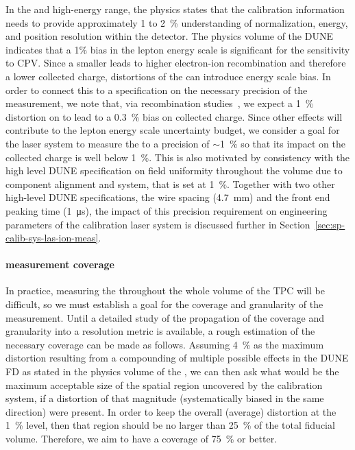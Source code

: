 In the  and high-energy range, the  physics  states that the calibration information needs to provide approximately \num{1} to \SI{2}{\%} understanding of normalization, energy, and position resolution within the detector.
The physics volume of the DUNE ~\cite{Acciarri:2015uup} indicates that a \num{1}\% bias in the lepton energy scale is significant for the  sensitivity to CPV. 
Since a smaller \efield leads to higher electron-ion recombination and therefore a lower collected charge, distortions of the \efield can introduce
energy scale bias. In order to connect this
to a specification on the necessary precision of the \efield measurement, we note that, via recombination studies~\cite{bib:mooney2018}, we expect a \SI{1}{\%} distortion on \efield to lead to a \SI{0.3}{\%} bias on collected charge.
Since other effects will contribute to the lepton energy scale uncertainty budget, we consider a goal for the 
laser system to measure the \efield to a precision of $\sim$\SI{1}{\%} so that its impact on the collected charge is well below \SI{1}{\%}.
This is also motivated by consistency with the high level DUNE specification on field uniformity throughout the volume due to component alignment and  system, that 
is set at \SI{1}{\%}.
Together with two other high-level DUNE specifications, the  wire spacing (\SI{4.7}{\mm}) and the front end peaking time (\SI{1}{\micro\s}), the impact of this \efield precision requirement on engineering parameters of the calibration laser system is discussed further %
in Section~\ref{sec:sp-calib-sys-las-ion-meas}.

\paragraph{\efield measurement coverage}

In practice, measuring the \efield  throughout the whole volume
of the TPC will be difficult, 
so we must establish a goal for the coverage and granularity of the measurement. 
Until a detailed study of the propagation of the coverage and granularity into a resolution metric is available, 
a rough estimation of the necessary coverage can be made as follows.
Assuming \SI{4}{\%} as the maximum \efield distortion resulting from a compounding of multiple possible effects in the DUNE FD as stated in the physics volume of the ,
we can then ask what would be the maximum acceptable size of the spatial region uncovered by the calibration system, if a distortion of that magnitude (systematically biased in the same direction) were present. In order to keep the overall (average) \efield distortion at the \SI{1}{\%} level, then that region should be no larger than \SI{25}{\%} of the total fiducial volume. Therefore, we aim to have a coverage of \SI{75}{\%} or better.

